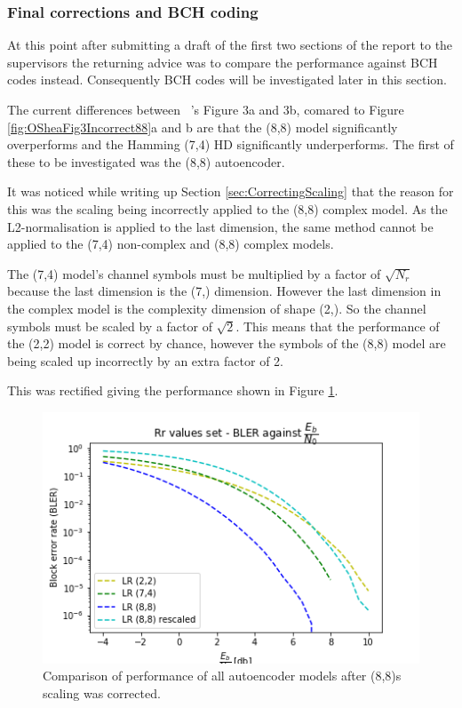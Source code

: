 \documentclass[12pt,onecolumn,letterpaper]{article}
\newcommand\genfigsize{0.5}
\begin{document}
\subsubsection{Final corrections and BCH coding}

At this point after submitting a draft of the first two sections of the report to the supervisors the returning advice was to compare the performance against BCH codes instead. Consequently BCH codes will be investigated later in this section.

The current differences between ~\cite{oShea}'s Figure 3a and 3b, comared to Figure \ref{fig:OSheaFig3Incorrect88}a and b are that the (8,8) model significantly overperforms and the Hamming (7,4) HD significantly underperforms. The first of these to be investigated was the (8,8) autoencoder. 

It was noticed while writing up Section \ref{sec:CorrectingScaling} that the reason for this was the scaling being incorrectly applied to the (8,8) complex model. As the L2-normalisation is applied to the last dimension, the same method cannot be applied to the (7,4) non-complex and (8,8) complex models. 

The (7,4) model's channel symbols must be multiplied by a factor of $\sqrt{N_r}$ because the last dimension is the (7,) dimension. However the last dimension in the complex model is the complexity dimension of shape (2,). So the channel symbols must be scaled by a factor of $\sqrt{2}$. This means that the performance of the (2,2) model is correct by chance, however the symbols of the (8,8) model are being scaled up incorrectly by an extra factor of 2.

This was rectified giving the performance shown in Figure \ref{fig:Autoencoders88ScalingCorrected}.

\begin{figure}[t]
   \centering
   \includegraphics[width=\genfigsize\linewidth]{figures/autoencoders_recorrected_88_scaling.png}
   \caption{Comparison of performance of all autoencoder models after (8,8)s scaling was corrected.}
   \label{fig:Autoencoders88ScalingCorrected}
\end{figure}
\end{document}
